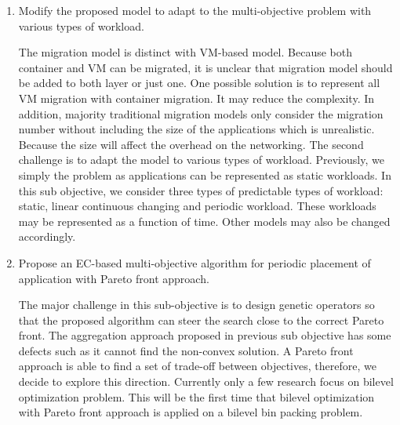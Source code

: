 \begin{enumerate}
	\item Modify the proposed model to adapt to the multi-objective problem with various types of workload. \\

	 The migration model is distinct with VM-based model. Because both container and VM can be migrated, it is unclear that migration model should be added to both layer or just one. One possible solution is to represent all VM migration with container migration. It may reduce the complexity. In addition, majority traditional migration models only consider the migration number without including the size of the applications which is unrealistic. Because the size will affect the overhead on the networking. 
	The second challenge is to adapt the model to various types of workload. Previously, we simply the problem as applications can be represented as static workloads. In this sub objective, we consider three types of predictable types of workload: static, linear continuous changing and periodic workload. These workloads may be represented as a function of time. Other models may also be changed accordingly.


	\item Propose an EC-based multi-objective algorithm for periodic placement of application with Pareto front approach.\\

	The major challenge in this sub-objective is to design genetic operators so that the proposed algorithm can steer the search close to the correct Pareto front. The aggregation approach proposed in previous sub objective has some defects such as it cannot find the non-convex solution. A Pareto front approach is able to find a set of trade-off between objectives, therefore, we decide to explore this direction. Currently only a few research \cite{Yin:2000bt, Deb:2009jh,Deb:2010in} focus on bilevel optimization problem. This will be the first time that bilevel optimization with Pareto front approach is applied on a bilevel bin packing problem.


\end{enumerate}
